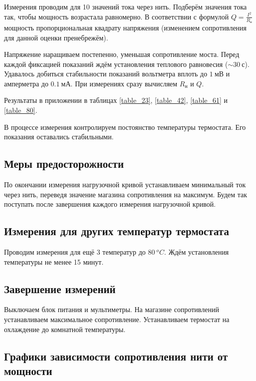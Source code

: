 \documentclass[a4paper, 12pt]{article}
\begin{document}
            Измерения проводим для 10 значений тока через нить. Подберём значения тока так, чтобы мощность возрастала равномерно. В соответствии с формулой $Q = \frac{I^2}{R_н}$ мощность пропорциональная квадрату напряжения (изменением сопротивления для данной оценки пренебрежём).

            Напряжение наращиваем постепенно, уменьшая сопротивление моста. Перед каждой фиксацией показаний ждём установления теплового равновесия ($\sim 30~с$). Удавалось добиться стабильности показаний вольтметра вплоть до $1~мВ$ и амперметра до $0.1~мА$. При измерениях сразу вычисляем $R_н$ и $Q$.

            Результаты в приложении в таблицах \ref{table_23}, \ref{table_42}, \ref{table_61} и \ref{table_80}.

            В процессе измерения контролируем постоянство температуры термостата. Его показания оставались стабильными.

        \subsection{Меры предосторожности}

            По окончании измерения нагрузочной кривой устанавливаем минимальный ток через нить, переведя значение магазина сопротивления на максимум. Будем так поступать после завершения каждого измерения нагрузочной кривой.

        \subsection{Измерения для других температур термостата}

            Проводим измерения для ещё 3 температур до $80~^oC$. Ждём установления температуры не менее 15 минут.

        \subsection{Завершение измерений}

            Выключаем блок питания и мультиметры. На магазине сопротивлений устанавливаем максимальное сопротивление. Устанавливаем термостат на охлаждение до комнатной температуры.

        \subsection{Графики зависимости сопротивления нити от мощности}
\end{document}

